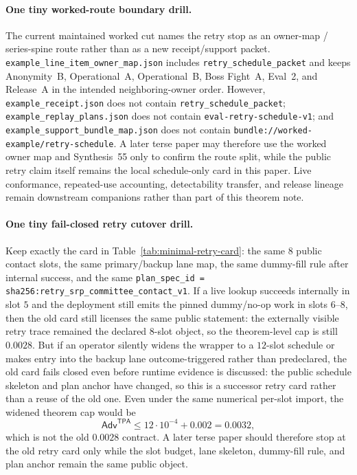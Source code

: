 \documentclass[11pt]{article}
\newcommand{\Adv}{\ensuremath{\mathsf{Adv}}}
\newcommand{\TPA}{\ensuremath{\mathsf{TPA}}}
\begin{document}
\paragraph{One tiny worked-route boundary drill.}
The current maintained worked cut names the retry stop as an owner-map / series-spine route rather than as a new receipt/support packet. \nolinkurl{example\_line\_item\_owner\_map.json} includes \nolinkurl{retry\_schedule\_packet} and keeps Anonymity~B, Operational~A, Operational~B, Boss Fight~A, Eval~2, and Release~A in the intended neighboring-owner order. However, \nolinkurl{example\_receipt.json} does not contain \nolinkurl{retry\_schedule\_packet}; \nolinkurl{example\_replay\_plans.json} does not contain \nolinkurl{eval-retry-schedule-v1}; and \nolinkurl{example\_support\_bundle\_map.json} does not contain \nolinkurl{bundle://worked-example/retry-schedule}. A later terse paper may therefore use the worked owner map and Synthesis~55 only to confirm the route split, while the public retry claim itself remains the local schedule-only card in this paper. Live conformance, repeated-use accounting, detectability transfer, and release lineage remain downstream companions rather than part of this theorem note.\cite{series:profiling,series:bossfightA,series:operationalB,series:advantagecontracts,series:releaseproperty,series:workedexample,series:seriesspines}

\paragraph{One tiny fail-closed retry cutover drill.}
Keep exactly the card in Table~\ref{tab:minimal-retry-card}: the same $8$ public contact slots, the same primary/backup lane map, the same dummy-fill rule after internal success, and the same \texttt{plan\_spec\_id = sha256:retry\_srp\_committee\_contact\_v1}.
If a live lookup succeeds internally in slot $5$ and the deployment still emits the pinned dummy/no-op work in slots $6$--$8$, then the old card still licenses the same public statement: the externally visible retry trace remained the declared $8$-slot object, so the theorem-level cap is still $0.0028$.
But if an operator silently widens the wrapper to a $12$-slot schedule or makes entry into the backup lane outcome-triggered rather than predeclared, the old card fails closed even before runtime evidence is discussed: the public schedule skeleton and plan anchor have changed, so this is a successor retry card rather than a reuse of the old one.
Even under the same numerical per-slot import, the widened theorem cap would be
\[
\Adv^{\TPA}\le 12\cdot 10^{-4}+0.002=0.0032,
\]
which is not the old $0.0028$ contract.
A later terse paper should therefore stop at the old retry card only while the slot budget, lane skeleton, dummy-fill rule, and plan anchor remain the same public object.
\end{document}
